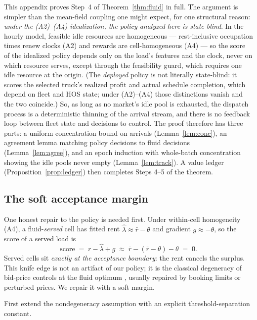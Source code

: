 \documentclass[11pt]{article}
\begin{document}
This appendix proves Step~4 of Theorem~\ref{thm:fluid} in full. The
argument is simpler than the mean-field coupling one might expect, for
one structural reason: \emph{under the (A2)--(A4) idealization, the
policy analyzed here is state-blind}. In the hourly model, feasible
idle resources are homogeneous --- rest-inclusive occupation times
renew clocks (A2) and rewards are cell-homogeneous (A4) --- so the
score of the idealized policy depends only on the load's features and
the clock, never on which resource serves, except through the
feasibility guard, which requires one idle resource at the origin.
(The \emph{deployed} policy is not literally state-blind: it scores
the selected truck's realized profit and actual schedule completion,
which depend on fleet and HOS state; under (A2)--(A4) those
distinctions vanish and the two coincide.) So, as long as
no market's idle pool is exhausted, the dispatch process is a
deterministic thinning of the arrival stream, and there is no feedback
loop between fleet state and decisions to control. The proof therefore
has three parts: a uniform concentration bound on arrivals
(Lemma~\ref{lem:conc}), an agreement lemma matching policy decisions to
fluid decisions (Lemma~\ref{lem:agree}), and an epoch induction with
whole-batch concentration
showing the idle pools never empty (Lemma~\ref{lem:track}). A value
ledger (Proposition~\ref{prop:ledger}) then completes Steps 4--5 of the
theorem.

\subsection{The soft acceptance margin}
\label{sec:margin}

One honest repair to the policy is needed first. Under within-cell
homogeneity (A4), a fluid-\emph{served} cell has fitted rent
$\hat{\lambda} \approx \bar{r} - \theta$ and gradient
$g \approx -\theta$, so the score of a served load is
\begin{equation}
  \mathrm{score} \;=\; r - \hat{\lambda} + g
  \;\approx\; \bar{r} - (\bar{r} - \theta) - \theta \;=\; 0.
\end{equation}
Served cells sit \emph{exactly at the acceptance boundary}: the rent
cancels the surplus. This knife edge is not an artifact of our policy;
it is the classical degeneracy of bid-price controls at the fluid
optimum \citep{talluri1998bidprice}, usually repaired by booking limits
or perturbed prices. We repair it with a soft margin.

First extend the nondegeneracy assumption with an explicit
threshold-separation constant.
\end{document}
